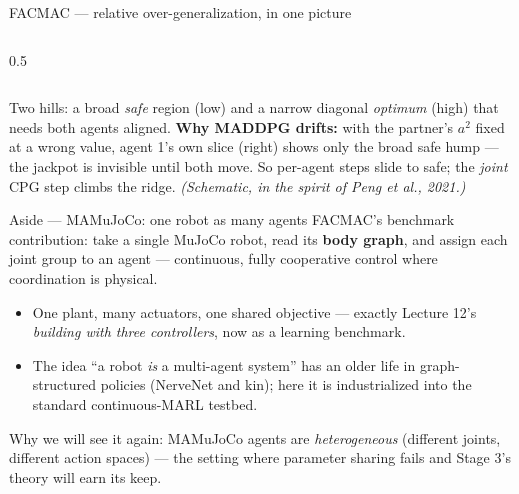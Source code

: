 \documentclass[10pt, aspectratio=169]{beamer}
\begin{document}
\begin{frame}{FACMAC --- relative over-generalization, in one picture}
\begin{columns}[T]
\begin{column}{0.5\linewidth}
\end{column}
\end{columns}
\smallskip
{\footnotesize\textcolor{mLightBrown}{Two hills: a broad \emph{safe} region (low) and a narrow diagonal \emph{optimum} (high) that needs both agents aligned. \textbf{Why MADDPG drifts:} with the partner's $a^2$ fixed at a wrong value, agent 1's own slice (right) shows only the broad safe hump --- the jackpot is \alert{invisible until both move}. So per-agent steps slide to safe; the \emph{joint} CPG step climbs the ridge. \emph{(Schematic, in the spirit of Peng et al., 2021.)}}}
\end{frame}

\begin{frame}{Aside --- MAMuJoCo: one robot as many agents}
FACMAC's benchmark contribution: take a single MuJoCo robot, read its \textbf{body graph}, and assign \alert{each joint group to an agent} --- continuous, fully cooperative control where coordination is physical.
\medskip

\begin{itemize}\setlength\itemsep{2pt}
\item One plant, many actuators, one shared objective --- exactly Lecture 12's \emph{building with three controllers}, now as a learning benchmark.
\item The idea ``a robot \emph{is} a multi-agent system'' has an older life in graph-structured policies (NerveNet and kin); here it is industrialized into the standard continuous-MARL testbed.
\end{itemize}
\medskip
\pause
{\footnotesize\textcolor{mLightBrown}{Why we will see it again: MAMuJoCo agents are \emph{heterogeneous} (different joints, different action spaces) --- the setting where parameter sharing fails and Stage 3's theory will earn its keep.}}
\end{frame}
\end{document}
